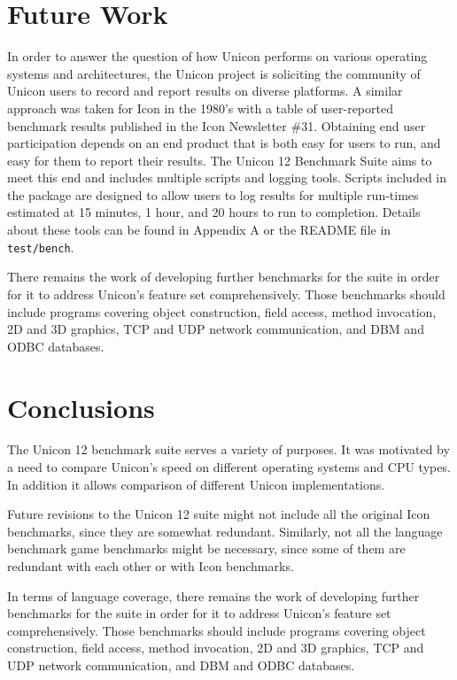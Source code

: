 \documentclass[letterpaper,12pt]{article}
\begin{document}
\section{Future Work}

In order to answer the question of how Unicon performs on various
operating systems and architectures, the Unicon project is soliciting
the community of Unicon users to record and report results on diverse
platforms. A similar approach was taken for Icon in the 1980's with a
table of user-reported benchmark results published in the Icon
Newsletter \#31\cite{griswold:newsletter}. Obtaining end user
participation depends on an end product that is both easy for users to
run, and easy for them to report their results. The Unicon 12
Benchmark Suite aims to meet this end and includes multiple scripts
and logging tools. Scripts included in the package are designed to
allow users to log results for multiple run-times estimated at 15
minutes, 1 hour, and 20 hours to run to completion. Details about
these tools can be found in Appendix A or the README file in {\tt
  test/bench}.

There remains the work of developing further benchmarks for the suite
in order for it to address Unicon's feature set comprehensively. Those
benchmarks should include programs covering object construction, field
access, method invocation, 2D and 3D graphics, TCP and UDP network
communication, and DBM and ODBC databases.

\section{Conclusions}

The Unicon 12 benchmark suite serves a variety of purposes. It was
motivated by a need to compare Unicon's speed on different operating
systems and CPU types. In addition it allows comparison of different
Unicon implementations. 

Future revisions to the Unicon 12 suite might not include all the
original Icon benchmarks, since they are somewhat
redundant. Similarly, not all the language benchmark game benchmarks
might be necessary, since some of them are redundant with each other
or with Icon benchmarks.

In terms of language coverage, there remains the work of developing
further benchmarks for the suite in order for it to address Unicon's
feature set comprehensively. Those benchmarks should include programs
covering object construction, field access, method invocation, 2D and
3D graphics, TCP and UDP network communication, and DBM and ODBC
databases.
\end{document}
